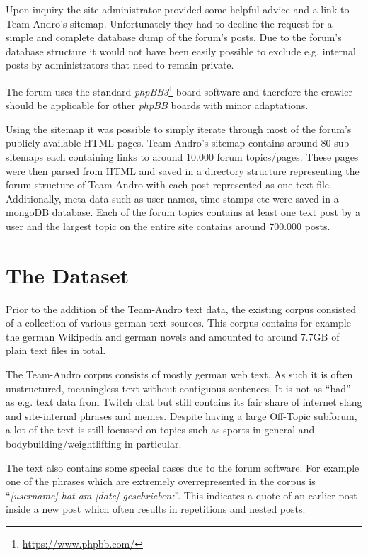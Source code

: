 \documentclass{scrartcl}
\begin{document}
Upon inquiry the site administrator provided some helpful advice and a link to Team-Andro's sitemap. Unfortunately they had to decline the request for a simple and complete database dump of the forum's posts. Due to the forum's database structure it would not have been easily possible to exclude e.g. internal posts by administrators that need to remain private.

The forum uses the standard \textit{phpBB3}\footnote{\url{https://www.phpbb.com/}} board software and therefore the crawler should be applicable for other \textit{phpBB} boards with minor adaptations.


Using the sitemap it was possible to simply iterate through most of the forum's publicly available HTML pages. Team-Andro's sitemap contains around 80 sub-sitemaps each containing links to around 10.000 forum topics/pages. These pages were then parsed from HTML and saved in a directory structure representing the forum structure of Team-Andro with each post represented as one text file. Additionally, meta data such as user names, time stamps etc were saved in a mongoDB database.
Each of the forum topics contains at least one text post by a user and the largest topic on the entire site contains around 700.000 posts.


\section{The Dataset}

Prior to the addition of the Team-Andro text data, the existing corpus consisted of a collection of various german text sources. This corpus contains for example the german Wikipedia and german novels and amounted to around 7.7GB of plain text files in total.


The Team-Andro corpus consists of mostly german web text. As such it is often unstructured, meaningless text without contiguous sentences. It is not as \enquote{bad} as e.g. text data from Twitch chat but still contains its fair share of internet slang and site-internal phrases and memes. Despite having a large Off-Topic subforum, a lot of the text is still focussed on topics such as sports in general and bodybuilding/weightlifting in particular.

The text also contains some special cases due to the forum software.
For example one of the phrases which are extremely overrepresented in the corpus is \enquote{\textit{[username] hat am [date] geschrieben:}}.
This indicates a quote of an earlier post inside a new post which often results in repetitions and nested posts.
\end{document}
